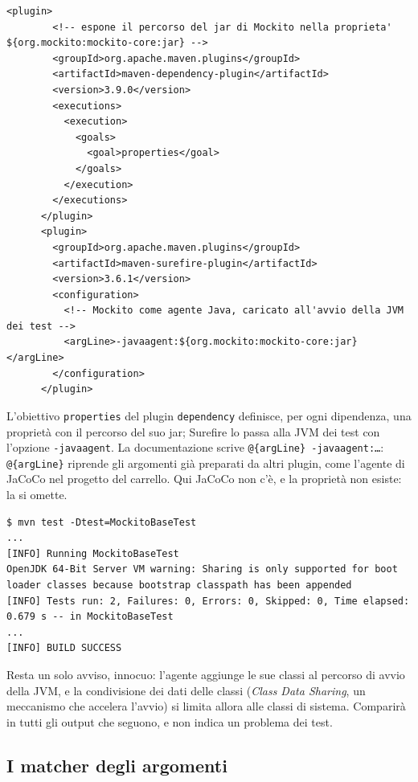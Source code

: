 \begin{lstlisting}[style=xml, name=pom.xml, firstnumber=46]
      <plugin>
        <!-- espone il percorso del jar di Mockito nella proprieta' ${org.mockito:mockito-core:jar} -->
        <groupId>org.apache.maven.plugins</groupId>
        <artifactId>maven-dependency-plugin</artifactId>
        <version>3.9.0</version>
        <executions>
          <execution>
            <goals>
              <goal>properties</goal>
            </goals>
          </execution>
        </executions>
      </plugin>
      <plugin>
        <groupId>org.apache.maven.plugins</groupId>
        <artifactId>maven-surefire-plugin</artifactId>
        <version>3.6.1</version>
        <configuration>
          <!-- Mockito come agente Java, caricato all'avvio della JVM dei test -->
          <argLine>-javaagent:${org.mockito:mockito-core:jar}</argLine>
        </configuration>
      </plugin>
\end{lstlisting}

L'obiettivo \texttt{properties} del plugin \texttt{dependency} definisce, per ogni dipendenza, una proprietà con il
percorso del suo jar; Surefire lo passa alla JVM dei test con l'opzione \texttt{-javaagent}. La documentazione scrive
\texttt{@\{argLine\} -javaagent:\ldots}: \texttt{@\{argLine\}} riprende gli argomenti già preparati da altri plugin, come
l'agente di JaCoCo nel progetto del carrello. Qui JaCoCo non c'è, e la proprietà non esiste: la si omette.

\begin{lstlisting}[style=shell, name=Terminale]
$ mvn test -Dtest=MockitoBaseTest
...
[INFO] Running MockitoBaseTest
OpenJDK 64-Bit Server VM warning: Sharing is only supported for boot loader classes because bootstrap classpath has been appended
[INFO] Tests run: 2, Failures: 0, Errors: 0, Skipped: 0, Time elapsed: 0.679 s -- in MockitoBaseTest
...
[INFO] BUILD SUCCESS
\end{lstlisting}

Resta un solo avviso, innocuo: l'agente aggiunge le sue classi al percorso di avvio della JVM, e la condivisione dei
dati delle classi (\textit{Class Data Sharing}, un meccanismo che accelera l'avvio) si limita allora alle classi di
sistema. Comparirà in tutti gli output che seguono, e non indica un problema dei test.

\subsection{I matcher degli argomenti}

